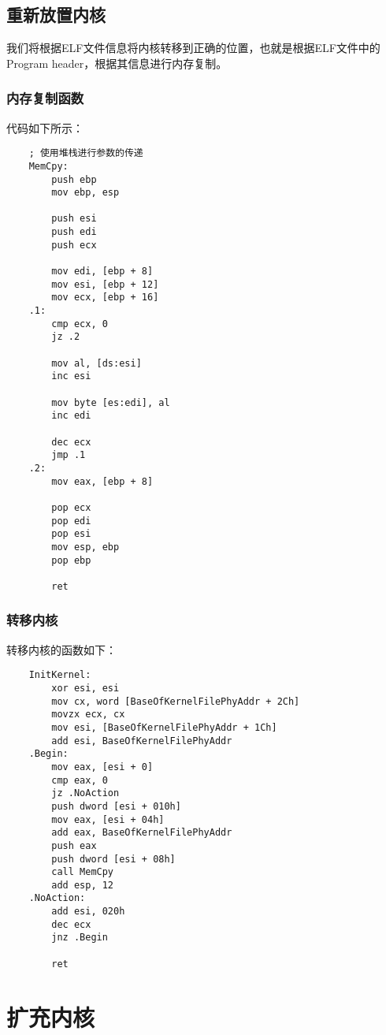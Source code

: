 \documentclass[a4paper,left=2.5cm,right=2.5cm,11pt]{article}
\begin{document}
\subsection{重新放置内核}
	我们将根据ELF文件信息将内核转移到正确的位置，也就是根据ELF文件中的Program header，根据其信息进行内存复制。
	
\subsubsection{内存复制函数}
	代码如下所示：
	\begin{lstlisting}
	; 使用堆栈进行参数的传递
	MemCpy:
		push ebp
		mov ebp, esp

		push esi
		push edi
		push ecx

		mov edi, [ebp + 8]
		mov esi, [ebp + 12]
		mov ecx, [ebp + 16]
	.1:
		cmp ecx, 0
		jz .2

		mov al, [ds:esi]
		inc esi

		mov byte [es:edi], al
		inc edi

		dec ecx
		jmp .1
	.2:
		mov eax, [ebp + 8]

		pop ecx
		pop edi
		pop esi
		mov esp, ebp
		pop ebp

		ret
	\end{lstlisting}

\subsubsection{转移内核}
	转移内核的函数如下：
	\begin{lstlisting}
	InitKernel:
		xor esi, esi
		mov cx, word [BaseOfKernelFilePhyAddr + 2Ch]
		movzx ecx, cx
		mov esi, [BaseOfKernelFilePhyAddr + 1Ch]
		add esi, BaseOfKernelFilePhyAddr
	.Begin:
		mov eax, [esi + 0]
		cmp eax, 0
		jz .NoAction
		push dword [esi + 010h]
		mov eax, [esi + 04h]
		add eax, BaseOfKernelFilePhyAddr
		push eax
		push dword [esi + 08h]
		call MemCpy
		add esp, 12
	.NoAction:
		add esi, 020h
		dec ecx
		jnz .Begin

		ret
	\end{lstlisting}

\section{扩充内核}
\end{document}

